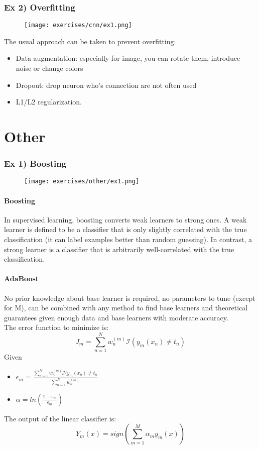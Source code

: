 \subsubsection{Ex 2) Overfitting}
\begin{figure}[H]
    \centering
    \texttt{[image: exercises/cnn/ex1.png]}
\end{figure}

The usual approach can be taken to prevent overfitting:
\begin{itemize}
\item Data augmentation: especially for image, you can rotate them, introduce noise or change colors
\item Dropout: drop neuron who's connection are not often used
\item L1/L2 regularization.
\end{itemize}


\section{Other}


\subsubsection{Ex 1) Boosting}

\begin{figure}[H]
    \centering
    \texttt{[image: exercises/other/ex1.png]}
\end{figure}

\paragraph{Boosting}
In supervised learning, boosting converts weak learners to strong ones. A weak learner is defined to be a classifier that is only slightly correlated with the true classification (it can label examples better than random guessing). In contrast, a strong learner is a classifier that is arbitrarily well-correlated with the true classification.

\paragraph{AdaBoost}
No prior knowledge about base learner is required, no parameters to tune (except for M), can be combined with any method to find base learners and theoretical guarantees given enough data and base learners with moderate accuracy.\\
The error function to minimize is:
\[J_m=\sum_{n=1}^N w_n^{(m)}\mathcal{I}(y_m(x_n)\neq t_n)\]
Given 
\begin{itemize}
\item $\epsilon_m = \frac{\sum_{n=1}^N w_n^{(m)}\mathcal{I}(y_m(x_n)\neq t_n}{\sum_{n=1}^N w_n^{(m)}}$
\item $\alpha=ln(\frac{1-\epsilon_m}{\epsilon_m})$
\end{itemize}
The output of the linear classifier is:
\[Y_m(x)=sign(\sum_{m=1}^M\alpha_my_m(x))\]


